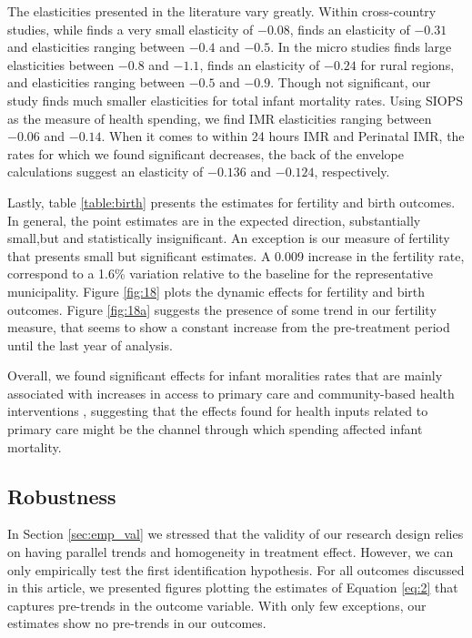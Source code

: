 The elasticities presented in the literature vary greatly. Within cross-country studies, while \cite{filmer1999} finds a very small elasticity of $-0.08$, \cite{gupta2002effectiveness} finds an elasticity of $-0.31$ and \cite{bokhari2007} elasticities ranging between $-0.4$ and $-0.5$. In the micro studies \cite{cremieux1999} finds large elasticities between $-0.8$ and $-1.1$, \cite{sonia2007} finds an elasticity of $-0.24$ for rural regions, and \cite{castro2021effects} elasticities ranging between $-0.5$ and $-0.9$. Though not significant, our study finds much smaller elasticities for total infant mortality rates. Using SIOPS as the measure of health spending, we find IMR elasticities ranging between $-0.06$ and $-0.14$. When it comes to within 24 hours IMR and Perinatal IMR, the rates for which we found significant decreases, the back of the envelope calculations suggest an elasticity of $-0.136$ and $-0.124$, respectively.




Lastly, table \ref{table:birth} presents the estimates for fertility and birth outcomes. In general, the point estimates are in the expected direction, substantially small,but and statistically insignificant. An exception is our measure of fertility that presents small but significant estimates. A 0.009 increase in the fertility rate, correspond to a 1.6\% variation relative to the baseline for the representative municipality. Figure \ref{fig:18} plots the dynamic effects for fertility and birth outcomes. Figure \ref{fig:18a} suggests the presence of some trend in our fertility measure, that seems to show a constant increase from the pre-treatment period until the last year of analysis.




Overall, we found significant effects for infant moralities rates that are mainly associated with increases in access to primary care and community-based health interventions \citep{rocha2010evaluating,bhalotra2019can}, suggesting that the effects found for health inputs related to primary care might be the channel through which spending affected infant mortality.


\subsection{Robustness}

In Section \ref{sec:emp_val} we stressed that the validity of our research design relies on having parallel trends and homogeneity in treatment effect. However, we can only empirically test the first identification hypothesis. For all outcomes discussed in this article, we presented figures plotting the estimates of Equation \ref{eq:2} that captures pre-trends in the outcome variable. With only few exceptions, our estimates show no pre-trends in our outcomes.

